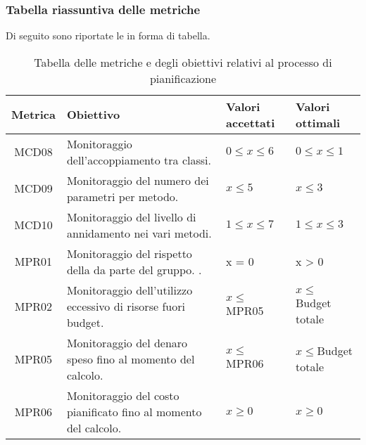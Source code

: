 \subsubsection{Tabella riassuntiva delle metriche}
Di seguito sono riportate le  in forma di tabella.
\begin{table}[H]
		\begin{center}
			\setlength{\aboverulesep}{0pt}
			\setlength{\belowrulesep}{0pt}
			\setlength{\extrarowheight}{.75ex}
			\begin{tabular}{ c C{6cm} C{3cm} C{3cm} }
				\textbf{Metrica} & \textbf{Obiettivo} & \textbf{Valori accettati} & \textbf{Valori ottimali}  \\
				\toprule
				MCD08 & Monitoraggio dell'accoppiamento tra classi. & $ 0 \leq x \leq 6$ & $ 0 \leq x \leq 1$  \\
				MCD09 & Monitoraggio del numero dei parametri per metodo. & $x \leq 5$ & $x \leq 3 $\\ 
				MCD10 & Monitoraggio del livello di annidamento nei vari metodi. & $1 \leq x \leq 7 $ & $1 \leq x \leq 3$ \\	
				
				MPR01 & Monitoraggio del rispetto della  da parte del gruppo. \gruppo{}. & x = 0 & x > 0 \\
				
				MPR02 & Monitoraggio dell'utilizzo eccessivo di risorse fuori budget. & $ x \leq$ MPR05 & $ x \leq$ Budget totale \\
				
				MPR05 & Monitoraggio del denaro speso fino al momento del calcolo. & $ x \leq $ MPR06 & $x \leq $Budget totale  \\
				
				MPR06 & Monitoraggio del costo pianificato fino al momento del calcolo. & $ x \geq 0$ & $x \geq 0$\\		
				

				\bottomrule
			\end{tabular}
			\caption{Tabella delle metriche e degli obiettivi relativi al processo di pianificazione}
		\end{center}
	\end{table}




